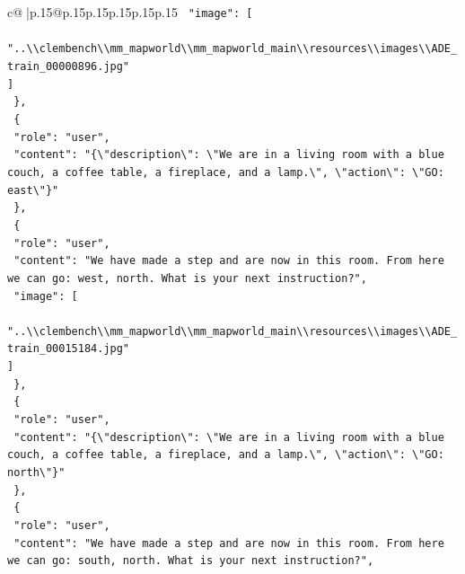 \documentclass{article}
\begin{document}
{\begin{supertabular}{c@{$\;$}|p{.15\linewidth}@{}p{.15\linewidth}p{.15\linewidth}p{.15\linewidth}p{.15\linewidth}p{.15\linewidth}}
{{{\texttt{    "image": {[}} \\
\texttt{      "..\textbackslash{}\textbackslash{}clembench\textbackslash{}\textbackslash{}mm\_mapworld\textbackslash{}\textbackslash{}mm\_mapworld\_main\textbackslash{}\textbackslash{}resources\textbackslash{}\textbackslash{}images\textbackslash{}\textbackslash{}ADE\_train\_00000896.jpg"} \\
\texttt{    {]}} \\
\texttt{  \},} \\
\texttt{  \{} \\
\texttt{    "role": "user",} \\
\texttt{    "content": "\{\textbackslash{}"description\textbackslash{}": \textbackslash{}"We are in a living room with a blue couch, a coffee table, a fireplace, and a lamp.\textbackslash{}", \textbackslash{}"action\textbackslash{}": \textbackslash{}"GO: east\textbackslash{}"\}"} \\
\texttt{  \},} \\
\texttt{  \{} \\
\texttt{    "role": "user",} \\
\texttt{    "content": "We have made a step and are now in this room. From here we can go: west, north. What is your next instruction?",} \\
\texttt{    "image": {[}} \\
\texttt{      "..\textbackslash{}\textbackslash{}clembench\textbackslash{}\textbackslash{}mm\_mapworld\textbackslash{}\textbackslash{}mm\_mapworld\_main\textbackslash{}\textbackslash{}resources\textbackslash{}\textbackslash{}images\textbackslash{}\textbackslash{}ADE\_train\_00015184.jpg"} \\
\texttt{    {]}} \\
\texttt{  \},} \\
\texttt{  \{} \\
\texttt{    "role": "user",} \\
\texttt{    "content": "\{\textbackslash{}"description\textbackslash{}": \textbackslash{}"We are in a living room with a blue couch, a coffee table, a fireplace, and a lamp.\textbackslash{}", \textbackslash{}"action\textbackslash{}": \textbackslash{}"GO: north\textbackslash{}"\}"} \\
\texttt{  \},} \\
\texttt{  \{} \\
\texttt{    "role": "user",} \\
\texttt{    "content": "We have made a step and are now in this room. From here we can go: south, north. What is your next instruction?",} \\
}}}
\end{supertabular}}
\end{document}
